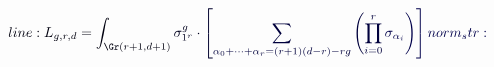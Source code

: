 \documentclass[12pt]{article}
\begin{document}
\makeatletter
\renewcommand*{\@textcolor}[3]{%
  \protect\leavevmode
  \begingroup
    \color#1{#2}#3%
  \endgroup
}
\makeatother
\begin{displaymath}
\mathcolor[RGB]{0,0,15}{line:
L_{g,r,d}=\int_{\Gr(r+1,d+1)}} \mathcolor[RGB]{0,0,30}{\sigma_{1^r}^g\cdot} \mathcolor[RGB]{0,0,45}{\left[} \mathcolor[RGB]{0,0,60}{\sum_{\alpha_0+\cdots+\alpha_r=(r+1)(d-r)-rg}\left(\prod_{i=0}^r} \mathcolor[RGB]{0,0,75}{\sigma_{\alpha_i}\right)\right]

norm_str:}
\end{displaymath}
\end{document}
